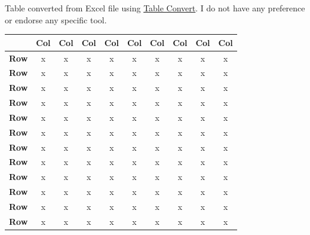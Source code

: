 Table converted from Excel file using \href{https://tableconvert.com/excel-to-latex}{Table Convert}. I do not have any preference or endorse any specific tool.

\begin{table}[H]
    \centering
    \begin{tabular}{|c|ccccccccc|}
    \hline
        \textbf{} & \textbf{Col} & \textbf{Col} & \textbf{Col} & \textbf{Col} & \textbf{Col} & \textbf{Col} & \textbf{Col} & \textbf{Col} & \textbf{Col} \\ \hline
        \textbf{Row} & x & x & x & x & x & x & x & x & x \\ 
        \textbf{Row} & x & x & x & x & x & x & x & x & x \\ 
        \textbf{Row} & x & x & x & x & x & x & x & x & x \\ 
        \textbf{Row} & x & x & x & x & x & x & x & x & x \\ 
        \textbf{Row} & x & x & x & x & x & x & x & x & x \\ 
        \textbf{Row} & x & x & x & x & x & x & x & x & x \\ 
        \textbf{Row} & x & x & x & x & x & x & x & x & x \\ 
        \textbf{Row} & x & x & x & x & x & x & x & x & x \\ 
        \textbf{Row} & x & x & x & x & x & x & x & x & x \\ 
        \textbf{Row} & x & x & x & x & x & x & x & x & x \\ 
        \textbf{Row} & x & x & x & x & x & x & x & x & x \\ 
        \textbf{Row} & x & x & x & x & x & x & x & x & x \\ \hline
    \end{tabular}
\end{table}


